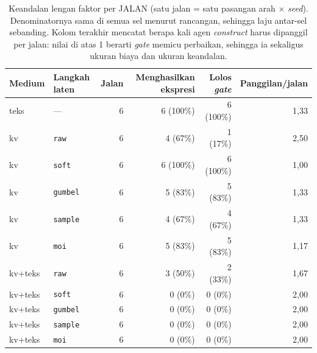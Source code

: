 \begin{table}[htbp]
\centering
\caption{Keandalan lengan faktor per JALAN (satu jalan = satu pasangan arah $\times$ \textit{seed}). Denominatornya sama di semua sel menurut rancangan, sehingga laju antar-sel sebanding. Kolom terakhir mencatat berapa kali agen \textit{construct} harus dipanggil per jalan: nilai di atas 1 berarti \textit{gate} memicu perbaikan, sehingga ia sekaligus ukuran biaya dan ukuran keandalan.}
\label{tab:faktor-keandalan}
\small
\begin{tabular}{llrrrr}
\hline
Medium & Langkah laten & Jalan & Menghasilkan ekspresi & Lolos \textit{gate} & Panggilan/jalan \\
\hline
teks & --- & 6 & 6 (100\%) & 6 (100\%) & 1,33 \\
\hline
kv & \texttt{raw} & 6 & 4 (67\%) & 1 (17\%) & 2,50 \\
kv & \texttt{soft} & 6 & 6 (100\%) & 6 (100\%) & 1,00 \\
kv & \texttt{gumbel} & 6 & 5 (83\%) & 5 (83\%) & 1,33 \\
kv & \texttt{sample} & 6 & 4 (67\%) & 4 (67\%) & 1,33 \\
kv & \texttt{moi} & 6 & 5 (83\%) & 5 (83\%) & 1,17 \\
\hline
kv+teks & \texttt{raw} & 6 & 3 (50\%) & 2 (33\%) & 1,67 \\
kv+teks & \texttt{soft} & 6 & 0 (0\%) & 0 (0\%) & 2,00 \\
kv+teks & \texttt{gumbel} & 6 & 0 (0\%) & 0 (0\%) & 2,00 \\
kv+teks & \texttt{sample} & 6 & 0 (0\%) & 0 (0\%) & 2,00 \\
kv+teks & \texttt{moi} & 6 & 0 (0\%) & 0 (0\%) & 2,00 \\
\hline
\end{tabular}
\end{table}
